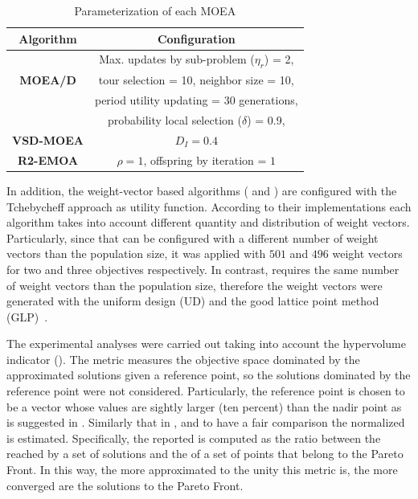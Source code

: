 %
\begin{table}[t]
\centering
\caption{Parameterization of each MOEA}
\label{tab:Parametrization}
\begin{tabular}{c|c}
\hline
\textbf{Algorithm} & \textbf{Configuration} \\ \hline
\multirow{3}{*}{\textbf{MOEA/D}} &Max. updates by sub-problem ($\eta_r$) = 2, \\
 & tour selection = 10,   neighbor size = 10, \\
 & period utility updating = 30 generations, \\ 
 & probability local selection ($\delta$) = 0.9,\\ \hline
\textbf{VSD-MOEA} & $D_I=0.4$ \\ \hline
\textbf{R2-EMOA} & $\rho=1$, offspring by iteration = $1$ \\ \hline
\end{tabular}
\end{table}


%
In addition, the weight-vector based algorithms (\MOEAD{} and \RMOEA{}) are configured with the Tchebycheff approach as utility function.
%
According to their implementations each algorithm takes into account different quantity and distribution of weight vectors.
%
Particularly, since that \RMOEA{} can be configured with a different number of weight vectors than the population size, it was applied with $501$ and $496$ weight vectors for two and three objectives respectively.
%
In contrast, \MOEAD{} requires the same number of weight vectors than the population size, therefore the weight vectors were generated with the uniform design (UD) and the good lattice point method (GLP)~\cite{Joel:MOEAD_Uniform_Design, Joel:Kuhn_Munkres}.


The experimental analyses were carried out taking into account the hypervolume indicator (\HV{}).
%
The \HV{} metric measures the objective space dominated by the approximated solutions given a reference point, so the solutions dominated by the reference point were not considered.
%
Particularly, the reference point is chosen to be a vector whose values are sightly larger (ten percent) than the nadir point as is suggested in \cite{ishibuchi2017reference}.
%
Similarly that in \cite{li2015evolutionary}, and to have a fair comparison the normalized \HV{} is estimated.
%
Specifically, the \HV{} reported is computed as the ratio between the \HV{} reached by a set of solutions and the \HV{} of a set of points that belong to the Pareto Front.
%
In this way, the more approximated to the unity this metric is, the more converged are the solutions to the Pareto Front.
%

